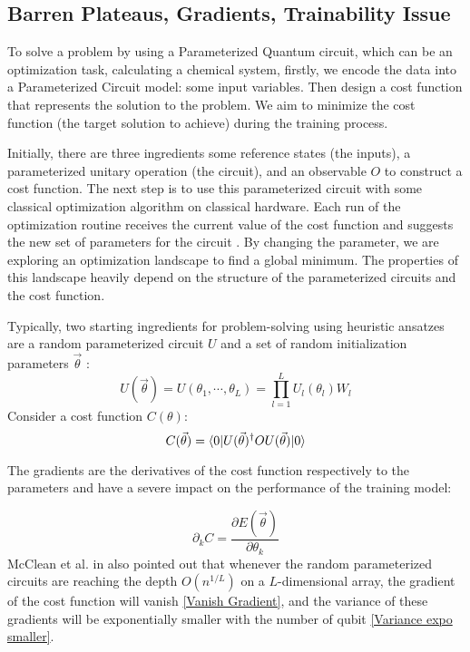 \subsection{Barren Plateaus, Gradients, Trainability Issue}

To solve a problem by using a Parameterized Quantum circuit, which can be an optimization task, calculating a chemical system, firstly, we encode the data into a Parameterized Circuit model: some input variables. 
Then design a cost function that represents the solution to the problem. We aim to minimize the cost function (the target solution to achieve) during the training process.

Initially, there are three ingredients some reference states (the inputs), a parameterized unitary operation (the circuit), and an observable $O$ to construct a cost function.
The next step is to use this parameterized circuit with some classical optimization algorithm on classical hardware.
Each run of the optimization routine receives the current value of the cost function and suggests the new set of parameters for the circuit \cite{cerezo2021variational}.
By changing the parameter, we are exploring an optimization landscape to find a global minimum.
The properties of this landscape heavily depend on the structure of the parameterized circuits and the cost function.

Typically, two starting ingredients for problem-solving using heuristic ansatzes are a random parameterized circuit $U$ and a set of random initialization parameters $\vec{\theta}$ \cite{mccleanBarrenPlateausQuantum2018}:
\begin{equation}\label{Parameterized Circuit}
    U(\vec{\theta})
    = U(\theta_1, \cdots, \theta_L)
    = \prod_{l=1}^L U_l(\theta_l)W_l
\end{equation}
Consider a cost function $C(\theta)$:
\begin{equation}\label{Cost function}
    C(\vec{\theta})
    = \bra{0} U(\vec{\theta})^\dagger OU(\vec{\theta}) \ket{0}
\end{equation}

The gradients are the derivatives of the cost function respectively to the parameters and have a severe impact on the performance of the training model:

\begin{equation}
    \partial_k C = \frac{\partial E(\vec{\theta})}{\partial\theta_k}
\end{equation}
McClean et al. in \cite{mccleanBarrenPlateausQuantum2018} also pointed out that whenever the random parameterized circuits are reaching the depth $O(n^{1/L})$ on a $L$-dimensional array, the gradient of the cost function will vanish \ref{Vanish Gradient}, and the variance of these gradients will be exponentially smaller with the number of qubit \ref{Variance expo smaller}. 


